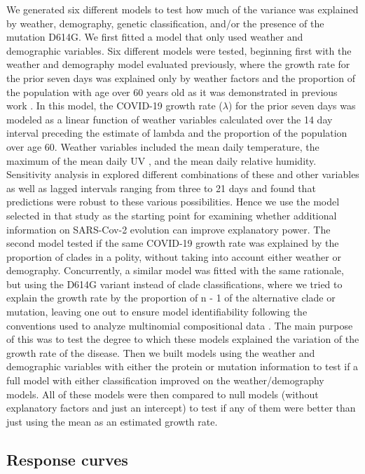 \documentclass[9pt,twocolumn,twoside,lineno]{pnas-new}
\begin{document}
{We generated six different models to test how much of the variance was explained by weather, demography, genetic classification, and/or the presence of the mutation D614G. We first fitted a model that only used weather and demographic variables. Six different models were tested, beginning first with the weather and demography model evaluated previously, where the growth rate for the prior seven days was explained only by weather factors and the proportion of the population with age over 60 years old as it was demonstrated in previous work \cite{Merow2020-be}. In this model, the COVID-19 growth rate ($\lambda$) for the prior seven days was modeled as a linear function of weather variables calculated over the 14 day interval preceding the estimate of lambda and the proportion of the population over age 60. Weather variables included the mean daily temperature, the maximum of the mean daily UV , and the mean daily relative humidity. Sensitivity analysis in \cite{Merow2020-be} explored different combinations of these and other variables as well as lagged intervals ranging from three to 21 days and found that predictions were robust to these various possibilities. Hence we use the model selected in that study as the starting point for examining whether additional information on SARS-Cov-2 evolution can improve explanatory power. The second model tested if the same COVID-19 growth rate was explained by the proportion of clades in a polity, without taking into account either weather or demography. Concurrently, a similar model was fitted with the same rationale, but using the D614G variant instead of clade classifications, where we tried to explain the growth rate by the proportion of n - 1 of the alternative clade or mutation, leaving one out to ensure model identifiability following the conventions used to analyze multinomial compositional data \cite{K_Gerald_van_den_Boogaart2013-ne}. The main purpose of this was to test the degree to which these models explained the variation of the growth rate of the disease. Then we built models using the weather and demographic variables with either the protein or mutation information to test if a full model with either classification improved on the weather/demography models. All of these models were then compared to null models (without explanatory factors and just an intercept) to test if any of them were better than just using the mean as an estimated growth rate.

\subsection*{Response curves}

}
\end{document}
